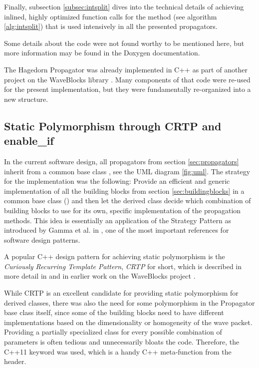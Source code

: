 Finally, subsection \ref{subsec:intsplit} dives into the technical details of achieving inlined, highly optimized function calls for the  method (see algorithm \ref{alg:intsplit}) that is used intensively in all the presented propagators.
\par\medskip
%
Some details about the code were not found worthy to be mentioned here,
but more information may be found in the Doxygen documentation.
\par\medskip
%
The Hagedorn Propagator was already implemented in C++ as part of another project on the WaveBlocks library \cite{libwaveblocks}.
Many components of that code were re-used for the present implementation, but they were fundamentally re-organized into a new structure.


\subsection{Static Polymorphism through CRTP and enable\_if}
\label{subsec:poly}
%
In the current software design, all propagators from section \ref{sec:propagators} inherit from a common base class , see the UML diagram \ref{fig:uml}.
The strategy for the implementation was the following:
Provide an efficient and generic implementation of all the building blocks from section \ref{sec:buildingblocks} in a common base class () and then let the derived class decide which combination of building blocks to use for its own, specific implementation of the propagation methods.
This idea is essentially an application of the Strategy Pattern as introduced by Gamma et al. in \cite{Gamma1995}, one of the most important references for software design patterns.
\par\medskip
%
A popular C++ design pattern for achieving static polymorphism is the \emph{Curiously Recurring Template Pattern}, \emph{CRTP} for short, which is described in more detail in \cite{C_CRTP} and in earlier work on the WaveBlocks project \cite{LWB_wavepackets}.
\par\medskip
%
While CRTP is an excellent candidate for providing static polymorphism for derived classes, there was also the need for some polymorphism in the Propagator base class itself, since some of the building blocks need to have different implementations based on the dimensionality or homogeneity of the wave packet. 
Providing a partially specialized class for every possible combination of parameters is often tedious and unnecessarily bloats the code.
Therefore, the C++11  keyword was used, which is a handy C++ meta-function from the  header.
